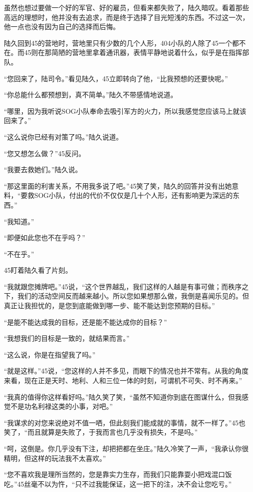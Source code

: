虽然也想过要做一个好的军官、好的雇员，但看来都失败了，陆久暗叹。看着那些高远的理想时，他并没有去追求，而是终于选择了目光短浅的东西。不过这一次，他一点也没有因为自己的选择而后悔。

陆久回到45的营地时，营地里只有少数的几个人形，404小队的人除了45一个都不在。而45则在那简陋的营地里拿着通讯器，表情平静地说着什么，似乎是在指挥部队。

“您回来了，陆司令。”看见陆久，45立即转向了他，“比我预想的还要快呢。”

“你总能什么都预想到，真不简单。”陆久不带感情地说道。

“哪里，因为我听说SOG小队奉命去吸引军方的火力，所以我感觉您应该马上就该回来了。”

“这么说你已经有对策了吗。”陆久说道。

“您又想怎么做？”45反问。

“我要去救她们。”陆久说。

“那这里面的利害关系，不用我多说了吧。”45笑了笑，陆久的回答并没有出她意料，“要救SOG小队，付出的代价不仅仅是几十个人形，还有影响更为深远的东西。”

“我知道。”

“即便如此您也不在乎吗？”

“不在乎。”

45盯着陆久看了片刻。

“我就跟您摊牌吧。”45说，“这个世界越乱，我们这样的人越是有事可做；而秩序之下，我们的活动空间反而越来越小。所以您如果想那么做，我倒是喜闻乐见的。但真正让我担忧的，是您到底能做到哪一步、能不能达到您预期的目标。”

“是能不能达成我的目标，还是能不能达成你的目标？”

“我想我们的目标是一致的，就结果而言。”

“这么说，你是在指望我了吗。”

“就是这样。”45说，“您这样的人并不多见，而眼下的情况也并不常有。从我的角度来看，现在正是天时、地利、人和三位一体的时刻，可谓机不可失、时不再来。”

“我真的值得你这样看好吗。”陆久笑了笑，“虽然不知道你到底在图谋什么，但我感觉不是功名利禄这类的小事，对吧。”

“我谋求的对您来说绝对不值一哂，但此刻我们能成就的事情，就不一样了。”45也笑了，“而且就算是失败了，于我而言也几乎没有损失，不是吗。”

“呵，这倒是。你几乎没有下注，却把把都在坐庄。”陆久冷笑了一声，“我承认你很精明，但这样的玩法我不太喜欢。”

“您不喜欢我是理所当然的，您是靠实力生存，而我们只能靠耍小把戏混口饭吃。”45丝毫不以为忤，“只不过我能保证，这一把下的注，决不会让您吃亏。”

